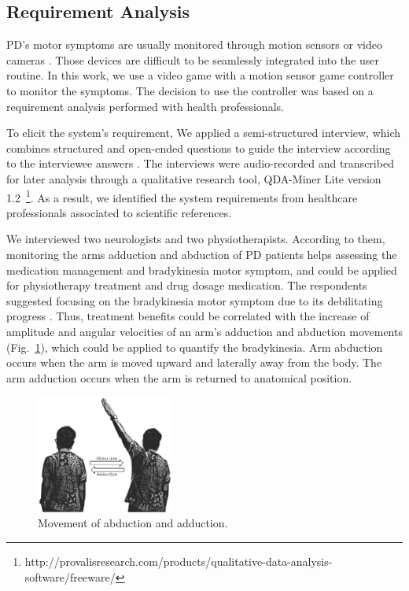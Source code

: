 \documentclass[10pt, conference, compsocconf]{IEEEtran}
\begin{document}
\subsection{Requirement Analysis}

PD's motor symptoms are usually monitored through motion sensors or video cameras  \cite{cbmshandwriting2015,patel_monitoring_2009}. Those devices are difficult to be seamlessly integrated into the user routine. In this work, we use a video game with a motion sensor game controller to monitor the symptoms. The decision to use the controller was based on a requirement analysis performed with health professionals. 

To elicit the system's requirement, We applied a semi-structured interview, which combines structured and open-ended questions to guide the interview according to the interviewee answers \cite{practical_guide_re2012}. The interviews were audio-recorded and transcribed for later analysis through a qualitative research tool, QDA-Miner Lite version 1.2~\footnote{http://provalisresearch.com/products/qualitative-data-analysis-software/freeware/}.  As a result, we identified the system requirements from healthcare professionals associated to scientific references.

We interviewed two neurologists and two physiotherapists. According to them, monitoring the arms adduction and abduction of PD patients helps assessing the medication management and bradykinesia motor symptom, and could be applied for physiotherapy treatment and drug dosage medication. The respondents suggested focusing on the bradykinesia motor symptom due to its debilitating progress \cite{national2006parkinson,ambulatory2010}. Thus, treatment benefits could be correlated with the increase of amplitude and angular velocities of an arm's adduction and abduction movements (Fig.~\ref{fig:abduction}), which could be applied to quantify the bradykinesia. Arm abduction occurs when the arm is moved upward and laterally away from the body. The arm adduction occurs when the arm is returned to anatomical position. 
%
%
%
%

\begin{figure}[!htb]
  \centering
  \includegraphics[width=0.4\textwidth]{./img/movaddcutctionartist.png}
  \caption{Movement of abduction and adduction.}
  \label{fig:abduction}
\end{figure}
\end{document}
